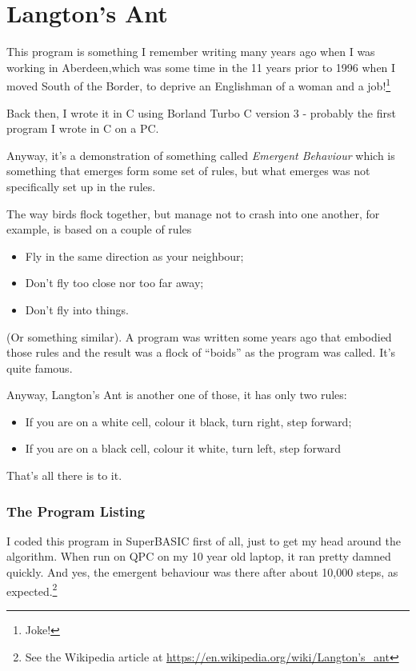 \chapter{Langton's Ant}\label{chp-langtons-ant}

This program is something I remember writing many years ago when I was working in Aberdeen,which was some time in the 11 years prior to 1996 when I moved South of the Border, to deprive an Englishman of a woman and a job!\footnote{Joke!}

Back then, I wrote it in C using Borland Turbo C version 3 - probably the first program I wrote in C on a PC.

Anyway, it's a demonstration of something called \emph{Emergent Behaviour} which is something that emerges form some set of rules, but what emerges was not specifically set up in the rules.

The way birds flock together, but manage not to crash into one another, for example, is based on a couple of rules

\begin{itemize}
	\item Fly in the same direction as your neighbour;
	\item Don't fly too close nor too far away;
	\item Don't fly into things.
\end{itemize}

(Or something similar). A program was written some years ago that embodied those rules and the result was a flock of ``boids'' as the program was called. It's quite famous.

Anyway, Langton's Ant is another one of those, it has only two rules:

\begin{itemize}
	\item If you are on a white cell, colour it black, turn right, step forward;
	\item If you are on a black cell, colour it white, turn left, step forward
\end{itemize}

That's all there is to it.

\subsection{The Program Listing}

I coded this program in SuperBASIC first of all, just to get my head around the algorithm. When run on QPC on my 10 year old laptop, it ran pretty damned quickly. And yes, the emergent behaviour was there after about 10,000 steps, as expected.\footnote{See the Wikipedia article at \href{https://en.wikipedia.org/wiki/Langton's\_ant}{https://en.wikipedia.org/wiki/Langton's\_ant}}

